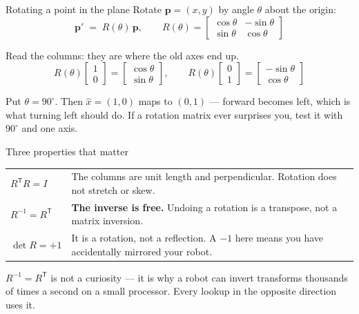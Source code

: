 \documentclass[aspectratio=169]{beamer}
\begin{document}
\begin{frame}{Rotating a point in the plane}
  \small
  Rotate $\mathbf{p}=(x,y)$ by angle $\theta$ about the origin:
  \[
    \mathbf{p}' \;=\; R(\theta)\,\mathbf{p},
    \qquad
    R(\theta)=
    \begin{bmatrix} \cos\theta & -\sin\theta \\[2pt] \sin\theta & \cos\theta \end{bmatrix}
  \]

  \vspace{0.4em}
  Read the columns: they are where the old axes end up.
  \[
    R(\theta)\begin{bmatrix}1\\0\end{bmatrix}
      = \begin{bmatrix}\cos\theta\\ \sin\theta\end{bmatrix},
    \qquad
    R(\theta)\begin{bmatrix}0\\1\end{bmatrix}
      = \begin{bmatrix}-\sin\theta\\ \cos\theta\end{bmatrix}
  \]

  \vspace{0.4em}
  \begin{underhood}
    \footnotesize
    Put $\theta = 90^\circ$. Then $\hat{x}=(1,0)$ maps to $(0,1)$ --- forward becomes left, which
    is what turning left should do. If a rotation matrix ever surprises you, test it with
    $90^\circ$ and one axis.
  \end{underhood}
\end{frame}

\begin{frame}{Three properties that matter}
  \small
  \begin{center}
  \begin{tabular}{@{}p{3.4cm}p{7.3cm}@{}}
    \toprule
    $R^{\mathsf T}R = I$ & The columns are unit length and perpendicular. Rotation does not
      stretch or skew. \\[0.4em]
    $R^{-1} = R^{\mathsf T}$ & \textbf{The inverse is free.} Undoing a rotation is a transpose,
      not a matrix inversion. \\[0.4em]
    $\det R = +1$ & It is a rotation, not a reflection. A $-1$ here means you have accidentally
      mirrored your robot. \\
    \bottomrule
  \end{tabular}
  \end{center}

  \vspace{0.8em}
  \begin{inthefield}
    \footnotesize
    $R^{-1}=R^{\mathsf T}$ is not a curiosity --- it is why a robot can invert transforms
    thousands of times a second on a small processor. Every lookup in the opposite direction
    uses it.
  \end{inthefield}
\end{frame}
\end{document}
